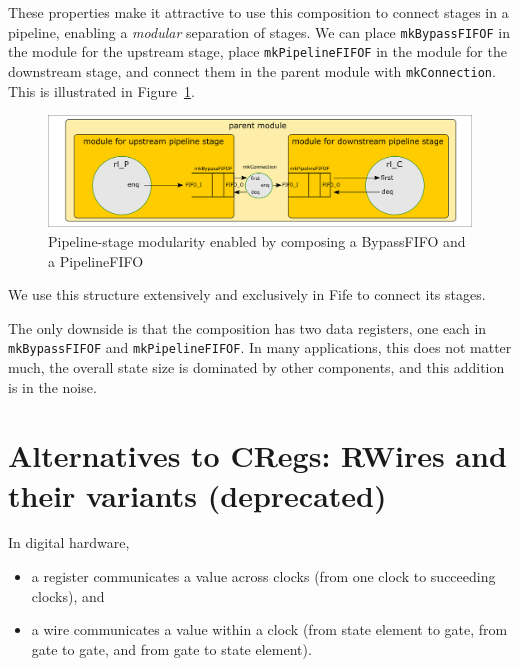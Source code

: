 These properties make it attractive to use this composition to connect
stages in a pipeline, enabling a \emph{modular} separation of stages.
We can place \verb|mkBypassFIFOF| in the module for the upstream
stage, place \verb|mkPipelineFIFOF| in the module for the downstream
stage, and connect them in the parent module with \verb|mkConnection|.
This is illustrated in Figure~\ref{Fig_Composed_FIFO_modularity}.
\begin{figure}[htbp]
  \centerline{\includegraphics[width=6in,angle=0]{Figures/Fig_Composed_FIFO_modularity}}
  \caption{\label{Fig_Composed_FIFO_modularity}
                  Pipeline-stage modularity enabled by composing a BypassFIFO and a PipelineFIFO}
\end{figure}
We use this structure extensively and exclusively in Fife to connect
its stages.

The only downside is that the composition has two data registers, one
each in \verb|mkBypassFIFOF| and \verb|mkPipelineFIFOF|.  In many
applications, this does not matter much, {\ie} the overall state size
is dominated by other components, and this addition is in the noise.




\section{Alternatives to CRegs: RWires and their variants (deprecated)}

\label{Sec_RWires}

In digital hardware,

\begin{itemize}

 \item a register communicates a value across clocks (from one clock to succeeding clocks), and

 \item a wire communicates a value within a clock (from state element
       to gate, from gate to gate, and from gate to state element).

\end{itemize}


